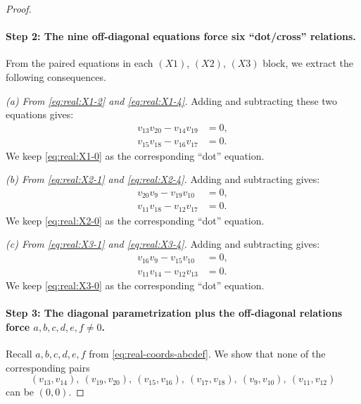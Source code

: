 \documentclass[11pt]{article}
\begin{document}
\begin{proof}
\paragraph{Step 2: The nine off-diagonal equations force six ``dot/cross'' relations.}
From the paired equations in each $(X1)$, $(X2)$, $(X3)$ block, we extract the following consequences.

\smallskip
\noindent\emph{(a) From \eqref{eq:real:X1-2} and \eqref{eq:real:X1-4}.}
Adding and subtracting these two equations gives:
\begin{align}
v_{13}v_{20}-v_{14}v_{19}&=0,
\tag{X1-cross-$ba$}\label{eq:real:X1-cross-ba}\\
v_{15}v_{18}-v_{16}v_{17}&=0.
\tag{X1-cross-$cd$}\label{eq:real:X1-cross-cd}
\end{align}
We keep \eqref{eq:real:X1-0} as the corresponding ``dot'' equation.

\smallskip
\noindent\emph{(b) From \eqref{eq:real:X2-1} and \eqref{eq:real:X2-4}.}
Adding and subtracting gives:
\begin{align}
v_{20}v_{9}-v_{19}v_{10}&=0,
\tag{X2-cross-$be$}\label{eq:real:X2-cross-be}\\
v_{11}v_{18}-v_{12}v_{17}&=0.
\tag{X2-cross-$df$}\label{eq:real:X2-cross-df}
\end{align}
We keep \eqref{eq:real:X2-0} as the corresponding ``dot'' equation.

\smallskip
\noindent\emph{(c) From \eqref{eq:real:X3-1} and \eqref{eq:real:X3-4}.}
Adding and subtracting gives:
\begin{align}
v_{16}v_{9}-v_{15}v_{10}&=0,
\tag{X3-cross-$ce$}\label{eq:real:X3-cross-ce}\\
v_{11}v_{14}-v_{12}v_{13}&=0.
\tag{X3-cross-$af$}\label{eq:real:X3-cross-af}
\end{align}
We keep \eqref{eq:real:X3-0} as the corresponding ``dot'' equation.

\paragraph{Step 3: The diagonal parametrization plus the off-diagonal relations force $a,b,c,d,e,f\neq 0$.}
Recall $a,b,c,d,e,f$ from \eqref{eq:real-coords-abcdef}.  We show that none of the corresponding pairs
\[
(v_{13},v_{14}),\ (v_{19},v_{20}),\ (v_{15},v_{16}),\ (v_{17},v_{18}),\ (v_9,v_{10}),\ (v_{11},v_{12})
\]
can be $(0,0)$.


\end{proof}
\end{document}
